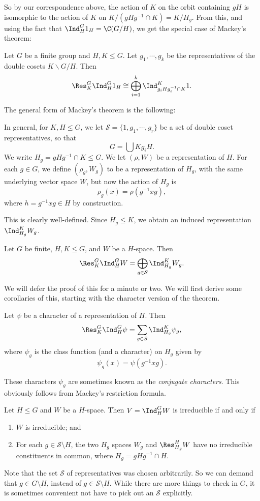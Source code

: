 \documentclass[a4paper]{article}
\begin{document}
So by our correspondence above, the action of $K$ on the orbit containing $gH$ is isomorphic to the action of $K$ on $K/(gHg^{-1} \cap K) = K/H_g$. From this, and using the fact that $\Ind_H^G 1_H = \C(G/H)$, we get the special case of Mackey's theorem:
\begin{prop}
  Let $G$ be a finite group and $H, K \leq G$. Let $g_1, \cdots, g_k$ be the representatives of the double cosets $K \backslash G/H$. Then
  \[
    \Res_K^G \Ind_H^G 1_H \cong \bigoplus_{i = 1}^k \Ind_{g_iHg_i^{-1} \cap K}^K 1.
  \]
\end{prop}

The general form of Mackey's theorem is the following:
\begin{thm}
  In general, for $K, H \leq G$, we let $\mathcal{S} = \{1, g_1, \cdots, g_r\}$ be a set of double coset representatives, so that
  \[
    G = \bigcup K g_i H.
  \]
  We write $H_g = gHg^{-1} \cap K \leq G$. We let $(\rho, W)$ be a representation of $H$. For each $g \in G$, we define $(\rho_g, W_g)$ to be a representation of $H_g$, with the same underlying vector space $W$, but now the action of $H_g$ is
  \[
    \rho_g(x) = \rho(g^{-1} xg),
  \]
  where $h = g^{-1}xg \in H$ by construction.

  This is clearly well-defined. Since $H_g \leq K$, we obtain an induced representation $\Ind_{H_g}^K W_g$.

  Let $G$ be finite, $H, K \leq G$, and $W$ be a $H$-space. Then
  \[
    \Res_K^G \Ind_H^G W = \bigoplus_{g \in \mathcal{S}} \Ind_{H_g}^K W_g.
  \]
\end{thm}
We will defer the proof of this for a minute or two. We will first derive some corollaries of this, starting with the character version of the theorem.
\begin{cor}
  Let $\psi$ be a character of a representation of $H$. Then
  \[
    \Res_K^G \Ind_H^G \psi = \sum_{g \in \mathcal{S}} \Ind_{H_g}^K \psi_g,
  \]
  where $\psi_g$ is the class function (and a character) on $H_g$ given by
  \[
    \psi_g(x) = \psi(g^{-1} xg).
  \]
\end{cor}
These characters $\psi_g$ are sometimes known as the \emph{conjugate characters}. This obviously follows from Mackey's restriction formula.

\begin{cor}
  Let $H \leq G$ and $W$ be a $H$-space. Then $V = \Ind_H^G W$ is irreducible if and only if
  \begin{enumerate}
    \item $W$ is irreducible; and
    \item For each $g \in \mathcal{S} \setminus H$, the two $H_g$ spaces $W_g$ and $\Res_{H_g}^H W$ have no irreducible constituents in common, where $H_g = gHg^{-1}\cap H$.
  \end{enumerate}
\end{cor}
Note that the set $\mathcal{S}$ of representatives was chosen arbitrarily. So we can demand that $g \in G \setminus H$, instead of $g \in \mathcal{S} \setminus H$. While there are more things to check in $G$, it is sometimes convenient not have to pick out an $\mathcal{S}$ explicitly.
\end{document}
